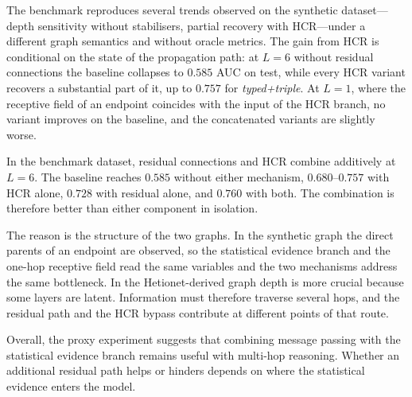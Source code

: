 The benchmark reproduces several trends
observed on the synthetic dataset---depth sensitivity without stabilisers,
partial recovery with HCR---under a different graph semantics and without
oracle metrics. The gain from HCR is conditional on the state of the
propagation path: at $L=6$ without
residual connections the baseline collapses to $0.585$ AUC on test, while every
HCR variant recovers a substantial part of it, up to $0.757$ for
\emph{typed+triple}. At $L=1$, where the receptive field of an endpoint
coincides with the input of the HCR branch, no variant improves on the
baseline, and the concatenated variants are slightly worse.

In the benchmark dataset, residual connections and HCR combine additively at
$L=6$. The baseline
reaches $0.585$ without either mechanism, $0.680$--$0.757$ with HCR alone,
$0.728$ with residual alone, and $0.760$ with both. The combination is
therefore better than either component in isolation.

The reason is the structure of the two graphs. In the synthetic graph the direct
parents of an endpoint are observed, so the statistical evidence branch and the one-hop
receptive field read the same variables and the two mechanisms address the same
bottleneck. In the Hetionet-derived graph depth is more crucial because some
layers are latent. Information must
therefore traverse several hops, and the residual path and the HCR bypass
contribute at different points of that route.

Overall, the proxy experiment suggests that combining message passing
with the statistical evidence branch remains useful with 
multi-hop reasoning. Whether an
additional residual path helps or hinders depends on where 
the statistical
evidence enters the model.


